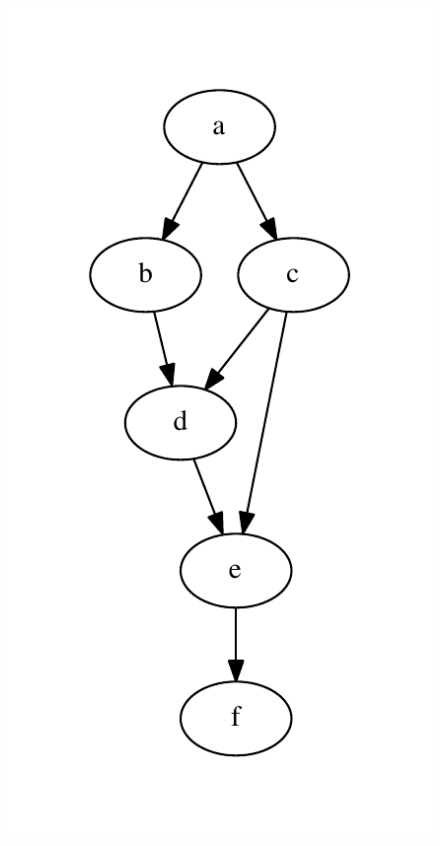 \documentclass[12pt,a4paper,final]{article}
\begin{document}
\begin{figure}[ht]
{        \includegraphics[scale=0.5]{directed.pdf}
        \label{fig:exemplo-grafo-direcionado}
    }    
    \subfloat[][ponderado] {
}
\end{figure}
\end{document}
